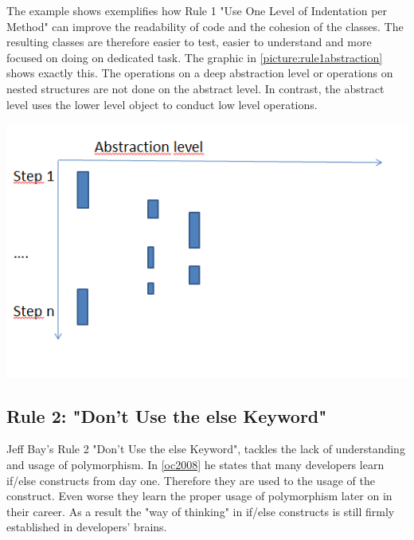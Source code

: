 The example shows exemplifies how Rule 1 "Use One Level of Indentation per Method" can improve the readability of code and the cohesion of the classes. The resulting classes are therefore easier to test, easier to understand and more focused on doing on dedicated task. The graphic in \ref{picture:rule1abstraction} shows exactly this. The operations on a deep abstraction level or operations on nested structures are not done on the abstract level. In contrast, the abstract level uses the lower level object to conduct low level operations. 

\includegraphics{Bilder/Rule1Abstraction.PNG}
\label{picture:rule1abstraction}

\subsection{Rule 2: "Don’t Use the else Keyword"}
\label{describe:rule2}
Jeff Bay's Rule 2 "Don’t Use the else Keyword", tackles the lack of understanding and usage of polymorphism. 
In \ref{oc2008} he states that many developers learn if/else constructs from day one. Therefore they are used to the usage of the construct. Even worse they learn the proper usage of polymorphism later on in their career. As a result the "way of thinking" in if/else constructs is still firmly established in developers' brains.
\\

